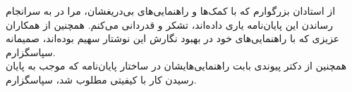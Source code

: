 


\begin{center}
\end{center}

از استادان بزرگوارم که با کمک‌ها و راهنمایی‌های بی‌دریغشان، مرا در به سرانجام رساندن این پایان‌نامه یاری داده‌اند، تشکر و قدردانی می‌کنم.
همچنین از همکاران عزیزی که با راهنمایی‌های خود در بهبود نگارش این نوشتار سهیم بوده‌اند، صمیمانه سپاسگزارم.\\

همچنین از دکتر پیوندی بابت راهنمایی‌هایشان در ساختار پایان‌نامه که موجب به پایان رسیدن کار با کیفیتی مطلوب شد، سپاسگزارم.
%
%
%
%

